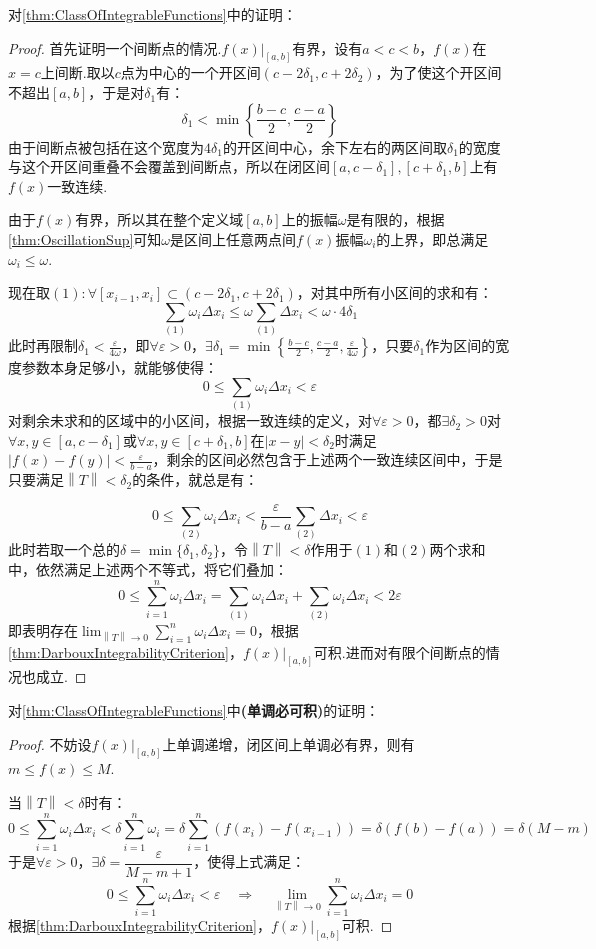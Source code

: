 对\cref{thm:ClassOfIntegrableFunctions}中的证明：
\begin{proof}
    首先证明一个间断点的情况.$\left.f(x)\right|_{[a,b]}$有界，设有$a<c<b$，$f(x)$在$x=c$上间断.取以$c$点为中心的一个开区间$(c-2\delta_1,c+2\delta_2)$，为了使这个开区间不超出$[a,b]$，于是对$\delta_1$有：
    \[\delta_1 < \min\left\{\frac{b-c}{2},\frac{c-a}{2}\right\}\]
    由于间断点被包括在这个宽度为$4\delta_1$的开区间中心，余下左右的两区间取$\delta_1$的宽度与这个开区间重叠不会覆盖到间断点，所以在闭区间$[a,c-\delta_1],[c+\delta_1,b]$上有$f(x)$一致连续.
    

    由于$f(x)$有界，所以其在整个定义域$[a,b]$上的振幅$\omega$是有限的，根据\cref{thm:OscillationSup}可知$\omega$是区间上任意两点间$f(x)$振幅$\omega_i$的上界，即总满足$\omega_i\leqslant\omega$.
    
    现在取$(1):\forall [x_{i-1},x_i] \subset (c-2\delta_1,c+2\delta_1)$，对其中所有小区间的求和有：
    \[\sum_{(1)}\omega_i\Delta x_i \leqslant \omega\sum_{(1)}\Delta x_i < \omega\cdot 4\delta_1\]
    此时再限制$\delta_1<\frac{\varepsilon}{4\omega}$，即$\forall\varepsilon>0$，$\exists\delta_1 = \min\left\{\frac{b-c}{2},\frac{c-a}{2},\frac{\varepsilon}{4\omega}\right\}$，只要$\delta_1$作为区间的宽度参数本身足够小，就能够使得：
    \[0 \leqslant \sum_{(1)}\omega_i\Delta x_i < \varepsilon\]
    对剩余未求和的区域中的小区间，根据一致连续的定义，对$\forall \varepsilon>0$，都$\exists \delta_2 > 0$对$\forall x,y\in[a,c-\delta_1]$或$\forall x,y\in[c+\delta_1,b]$在$|x-y|<\delta_2$时满足$|f(x)-f(y)|<\frac{\varepsilon}{b-a}$，剩余的区间必然包含于上述两个一致连续区间中，于是只要满足$\left\|T\right\|<\delta_2$的条件，就总是有：

    \[0 \leqslant \sum_{(2)}\omega_i\Delta x_i < \frac{\varepsilon}{b-a}\sum_{(2)}\Delta x_i < \varepsilon\]
    此时若取一个总的$\delta = \min\{\delta_1,\delta_2\}$，令$\left\|T\right\|<\delta$作用于$(1)$和$(2)$两个求和中，依然满足上述两个不等式，将它们叠加：
    \[0 \leqslant \sum_{i=1}^{n}\omega_i\Delta x_i = \sum_{(1)}\omega_i\Delta x_i + \sum_{(2)}\omega_i\Delta x_i < 2\varepsilon\]
    即表明存在$\displaystyle\lim_{\left\|T\right\| \to 0}\sum_{i=1}^{n}\omega_i\Delta x_i = 0$，根据\cref{thm:DarbouxIntegrabilityCriterion}，$\left.f(x)\right|_{[a,b]}$可积.进而对有限个间断点的情况也成立.
\end{proof}

对\cref{thm:ClassOfIntegrableFunctions}中\textbf{(单调必可积)}的证明：
\begin{proof}
    不妨设$\left.f(x)\right|_{[a,b]}$上单调递增，闭区间上单调必有界，则有$m \leqslant f(x) \leqslant M$.

    当$\left\|T\right\|<\delta$时有：
    \[0 \leqslant \sum_{i=1}^{n}\omega_i\Delta x_i < \delta\sum_{i=1}^{n}\omega_i = \delta\sum_{i=1}^{n}(f(x_i)-f(x_{i-1})) = \delta(f(b)-f(a)) = \delta(M-m)\]
    于是$\forall \varepsilon > 0$，$\exists \delta = \dfrac{\varepsilon}{M-m+1}$，使得上式满足：
    \[0 \leqslant \sum_{i=1}^{n}\omega_i\Delta x_i < \varepsilon \quad\Rightarrow\quad \lim_{\left\|T\right\| \to 0}\sum_{i=1}^{n}\omega_i\Delta x_i = 0\]
    根据\cref{thm:DarbouxIntegrabilityCriterion}，$\left.f(x)\right|_{[a,b]}$可积.
\end{proof}

